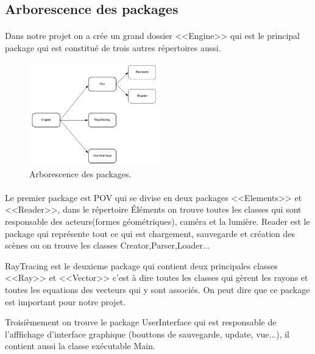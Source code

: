 \documentclass[12pt]{article}
\begin{document}
		\subsection{Arborescence des packages}
		       \paragraph{}
		       Dans notre projet on a crée un grand dossier <<Engine>> qui est le principal package qui est constitué de trois autres répertoires aussi.
		       
		       \begin{figure}[h]
                    \begin{center}
                    \includegraphics[width=0.5\textwidth]{./images/Arborescence.png}
                    \end{center}
                    \caption{Arborescence des packages.}
                    \label{fig}
                \end{figure}
		       
		       \paragraph{}
		       Le premier package est POV qui se divise en deux packages <<Elements>> et <<Reader>>, dans le répertoire Éléments on trouve toutes les classes qui sont responsable des acteurs(formes géométriques), caméra et la lumière. Reader est le package qui représente tout ce qui est chargement, sauvegarde et création des scènes ou on trouve les classes Creator,Parser,Loader...
		       
		       RayTracing est le deuxieme package qui contient deux principales classes <<Ray>> et <<Vector>> c'est à dire toutes les classes qui gèrent les rayons et toutes les equations des vecteurs qui y sont associés. On peut dire que ce package est important pour notre projet.
		       
		       Troisièmement on trouve le package UserInterface qui est responsable de l'afffichage d'interface graphique (bouttons de sauvegarde, update, vue...), il contient aussi la classe exécutable Main.
		\newpage
\end{document}
